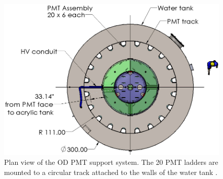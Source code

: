 \begin{figure}[!ht]
    \centering
    \includegraphics[width=0.7\linewidth]{figures/LZ/OD_PMT_support.jpg}
    \caption{Plan view of the OD PMT support system. The 20 PMT ladders are mounted to a circular track attached to the walls of the water tank \cite{LZTDR}.}
    \label{fig:LZ/ODPMT_Array}
\end{figure}
